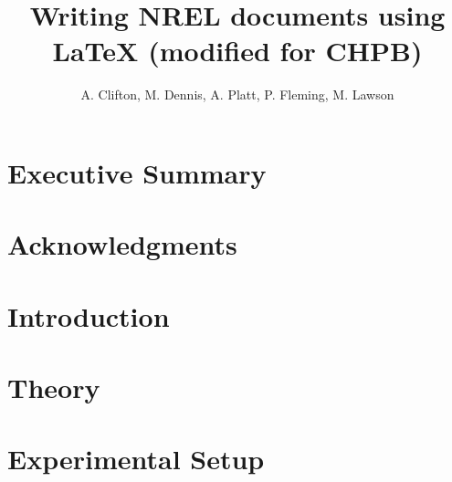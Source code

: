 \documentclass[]{nrel}
\title{Writing NREL documents using LaTeX (modified for CHPB)}
\author{A. Clifton, M. Dennis, A. Platt, P. Fleming, M. Lawson}
\begin{document}
\frontmatter
\chapter{Executive Summary}

\chapter{Acknowledgments}


\clearpage
\tableofcontents
\listoffigures
\listoftables

\mainmatter
\pagestyle{fancy}
\chapter{Introduction} %
\label{sec:intro}



\chapter{Theory}
\label{sec:theory}

\chapter{Experimental Setup}
\label{sec:exp}
\end{document}
